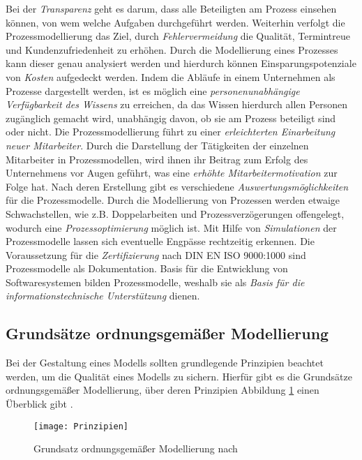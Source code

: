 Bei der \textit{Transparenz} geht es darum, dass alle Beteiligten am Prozess einsehen können, von wem welche Aufgaben durchgeführt werden. Weiterhin verfolgt die Prozessmodellierung das Ziel, durch \textit{Fehlervermeidung} die Qualität, Termintreue und Kundenzufriedenheit zu erhöhen. Durch die Modellierung eines Prozesses kann dieser genau analysiert werden und hierdurch können Einsparungspotenziale von \textit{Kosten} aufgedeckt werden. Indem die Abläufe in einem Unternehmen als Prozesse dargestellt werden, ist es möglich eine \textit{personenunabhängige Verfügbarkeit des Wissens} zu erreichen, da das Wissen hierdurch allen Personen zugänglich gemacht wird, unabhängig davon, ob sie am Prozess beteiligt sind oder nicht. Die Prozessmodellierung führt zu einer \textit{erleichterten Einarbeitung neuer Mitarbeiter}. Durch die Darstellung der Tätigkeiten der einzelnen Mitarbeiter in Prozessmodellen, wird ihnen ihr Beitrag zum Erfolg des Unternehmens vor Augen geführt, was eine \textit{erhöhte Mitarbeitermotivation} zur Folge hat. Nach deren Erstellung gibt es verschiedene \textit{Auswertungsmöglichkeiten} für die Prozessmodelle. Durch die Modellierung von Prozessen werden etwaige Schwachstellen, wie z.B. Doppelarbeiten und Prozessverzögerungen offengelegt, wodurch eine \textit{Prozessoptimierung} möglich ist. Mit Hilfe von \textit{Simulationen} der Prozessmodelle lassen sich eventuelle Engpässe rechtzeitig erkennen. Die Voraussetzung für die \textit{Zertifizierung} nach DIN EN ISO 9000:1000 sind Prozessmodelle als Dokumentation. Basis für die Entwicklung von Softwaresystemen bilden Prozessmodelle, weshalb sie als \textit{Basis für die informationstechnische Unterstützung} dienen.

\subsection{Grundsätze ordnungsgemäßer Modellierung}

Bei der Gestaltung eines Modells sollten grundlegende Prinzipien beachtet werden, um die Qualität eines Modells zu sichern. Hierfür gibt es die Grundsätze ordnungsgemäßer Modellierung, über deren Prinzipien Abbildung \ref{fig:Prinzipien} einen Überblick gibt  \cite{freund2007}.

\begin{figure}[htp]
\begin{center}
  \texttt{[image: Prinzipien]} %
  \caption{Grundsatz ordnungsgemäßer Modellierung nach \cite{journals95}}
  \label{fig:Prinzipien}
\end{center}
\end{figure}

